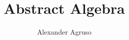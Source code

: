\documentclass[12pt]{book}
\begin{document}

    \title{Abstract Algebra}
    \author{Alexander Agruso}
    \date{}

    \maketitle

    \pagestyle{fancy}

    


    \setcounter{chapter}{-1} %

    
\end{document}
